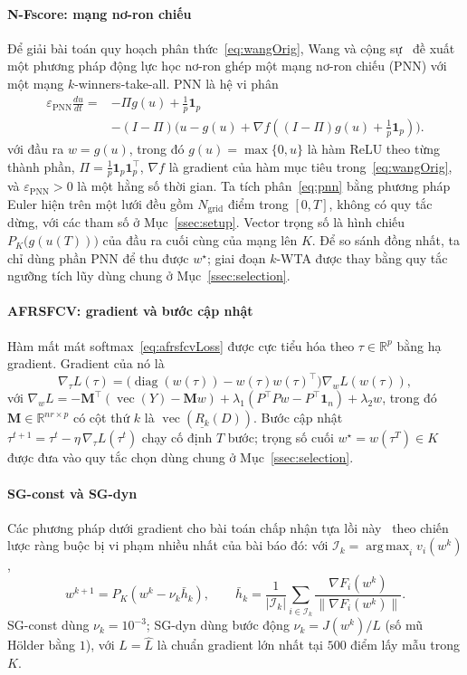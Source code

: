 \documentclass[]{interact}
\theoremstyle{plain}
\theoremstyle{definition}
\theoremstyle{remark}
\newcommand{\R}{\mathbb{R}}
\DeclareMathOperator*{\argmax}{arg\,max}
\DeclareMathOperator{\diag}{diag}
\DeclareMathOperator{\vecop}{vec}
\begin{document}
\paragraph*{N-Fscore: mạng nơ-ron chiếu}
Để giải bài toán quy hoạch phân thức~\eqref{eq:wangOrig}, Wang và cộng sự~\citep{wang2021fractional} đề xuất một phương pháp động lực học nơ-ron ghép một mạng nơ-ron chiếu (PNN) với một mạng $k$-winners-take-all. PNN là hệ vi phân
\begin{equation}\label{eq:pnn}
\begin{split}\varepsilon_{\mathrm{PNN}}\frac{du}{dt}={}&-\Pi g(u)+\tfrac1p\mathbf{1}_p\\&-(I-\Pi)\bigl(u-g(u)+\nabla f((I-\Pi)g(u)+\tfrac1p\mathbf{1}_p)\bigr).\end{split}
\end{equation}
với đầu ra $w=g(u)$, trong đó $g(u)=\max\{0,u\}$ là hàm ReLU theo từng thành phần, $\Pi=\tfrac1p\mathbf{1}_p\mathbf{1}_p^{\top}$, $\nabla f$ là gradient của hàm mục tiêu trong~\eqref{eq:wangOrig}, và $\varepsilon_{\mathrm{PNN}}>0$ là một hằng số thời gian. Ta tích phân~\eqref{eq:pnn} bằng phương pháp Euler hiện trên một lưới đều gồm $N_{\mathrm{grid}}$ điểm trong $[0,T]$, không có quy tắc dừng, với các tham số ở Mục~\ref{ssec:setup}. Vector trọng số là hình chiếu $P_K\bigl(g(u(T))\bigr)$ của đầu ra cuối cùng của mạng lên $K$. Để so sánh đồng nhất, ta chỉ dùng phần PNN để thu được $w^\star$; giai đoạn $k$-WTA được thay bằng quy tắc ngưỡng tích lũy dùng chung ở Mục~\ref{ssec:selection}.

\paragraph*{AFRSFCV: gradient và bước cập nhật}
Hàm mất mát softmax~\eqref{eq:afrsfcvLoss} được cực tiểu hóa theo $\tau\in\R^p$ bằng hạ gradient. Gradient của nó là
\begin{equation}\label{eq:gradTau}
\nabla_\tau L(\tau)=\bigl(\diag(w(\tau))-w(\tau)w(\tau)^{\top}\bigr)\nabla_w L(w(\tau)),
\end{equation}
với $\nabla_w L=-\mathbf{M}^{\top}(\vecop(Y)-\mathbf{M}w)+\lambda_1(P^{\top}Pw-P^{\top}\mathbf{1}_n)+\lambda_2 w$, trong đó $\mathbf{M}\in\R^{nr\times p}$ có cột thứ $k$ là $\vecop(\underline{R_k}(D))$. Bước cập nhật $\tau^{t+1}=\tau^t-\eta\,\nabla_\tau L(\tau^t)$ chạy cố định $T$ bước; trọng số cuối $w^\star=w(\tau^T)\in K$ được đưa vào quy tắc chọn dùng chung ở Mục~\ref{ssec:selection}.

\paragraph*{SG-const và SG-dyn}
Các phương pháp dưới gradient cho bài toán chấp nhận tựa lồi này~\citep{hu2022quasi} theo
chiến lược ràng buộc bị vi phạm nhiều nhất của bài báo đó: với $\mathcal I_k=\argmax_i v_i(w^k)$,
\[
w^{k+1}=P_K(w^k-\nu_k\bar h_k),\qquad
\bar h_k=\frac1{|\mathcal I_k|}\sum_{i\in\mathcal I_k}\frac{\nabla F_i(w^k)}{\|\nabla F_i(w^k)\|}.
\]
SG-const dùng $\nu_k=10^{-3}$; SG-dyn dùng bước động $\nu_k=J(w^k)/L$ (số mũ H\"older
bằng $1$), với $L=\widehat L$ là chuẩn gradient lớn nhất tại $500$ điểm lấy mẫu trong $K$.
\end{document}
